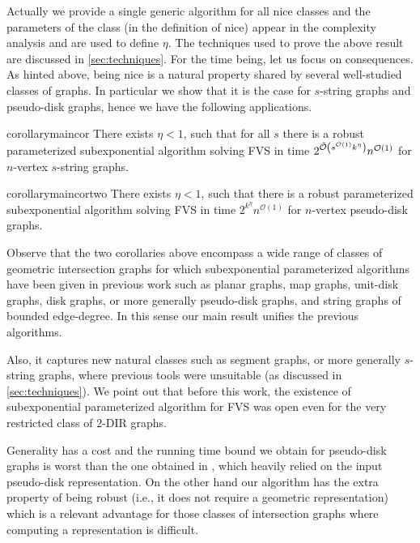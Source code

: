 \documentclass{amsart}
\DeclareMathOperator\TO{\Tilde{\O}}
\newcommand{\FVS}{\textsc{FVS}\xspace}
\renewcommand{\O}{\mathcal{O}}
\begin{document}
Actually we provide a single generic algorithm for all nice classes and the parameters of the class (in the definition of nice) appear in the complexity analysis and are used to define $\eta$.
The techniques used to prove the above result are discussed in \autoref{sec:techniques}. For the time being, let us focus on consequences.
As hinted above, being nice is a natural property shared by several well-studied classes of graphs. In particular we show that it is the case for $s$-string graphs and pseudo-disk graphs, hence we have the following applications.

\begin{restatable}{corollary}{maincor}\label{cor:main}
There exists $\eta<1$, such that for all $s$ there is a robust parameterized subexponential algorithm solving \FVS in time $2^{\TO \left (s^{\O(1)}k^{\eta}\right )}n^{\O(1)}$ for $n$-vertex $s$-string graphs.
\end{restatable}


\begin{restatable}{corollary}{maincortwo}\label{cor:main2}
There exists $\eta<1$, such that there is a robust parameterized subexponential algorithm solving \FVS in time $2^{k^{\eta}}n^{\O(1)}$ for $n$-vertex pseudo-disk graphs.
\end{restatable}

Observe that the two corollaries above encompass a wide range of classes of geometric intersection graphs for which subexponential parameterized algorithms have been given in previous work such as planar graphs, map graphs, unit-disk graphs, disk graphs, or more generally pseudo-disk graphs, and string graphs of bounded edge-degree. In this sense our main result unifies the previous algorithms.

Also, it captures new natural classes such as segment graphs, or more generally $s$-string graphs, where previous tools were unsuitable (as discussed in \autoref{sec:techniques}). We point out that before this work, the existence of subexponential parameterized algorithm for \FVS was open even for the very restricted class of $2$-DIR graphs.

Generality has a cost and the running time bound we obtain for pseudo-disk graphs
is worst than the one obtained in \cite{FVS-WG}, which heavily relied on the input pseudo-disk representation. 
On the other hand our algorithm has the extra property of being robust (i.e., it does not require a geometric representation) which is a relevant advantage for those classes of intersection graphs where computing a representation is difficult.
\end{document}
